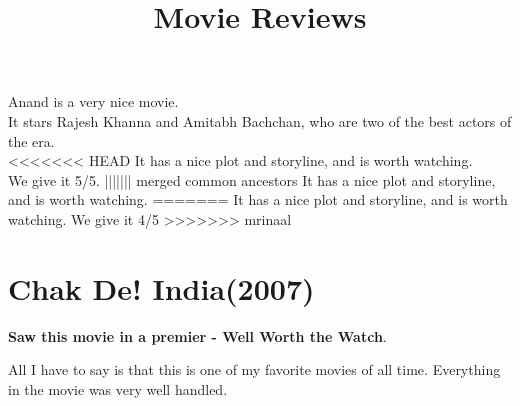\documentclass[11pt]{article}
\title{\textbf{Movie Reviews}}
\author{}
\date{}
\begin{document}
\maketitle
{}
Anand is a very nice movie.\\
It stars Rajesh Khanna and Amitabh Bachchan, who are two of the best actors of the era.\\
<<<<<<< HEAD
It has a nice plot and storyline, and is worth watching.\\
We give it 5/5.
||||||| merged common ancestors
It has a nice plot and storyline, and is worth watching.
=======
It has a nice plot and storyline, and is worth watching.
We give it 4/5
>>>>>>> mrinaal

\section*{Chak De! India(2007)}
\textbf{Saw this movie in a premier - Well Worth the Watch}.

All I have to say is that this is one of my favorite movies of all time. Everything in the movie was very well handled.
\end{document}
